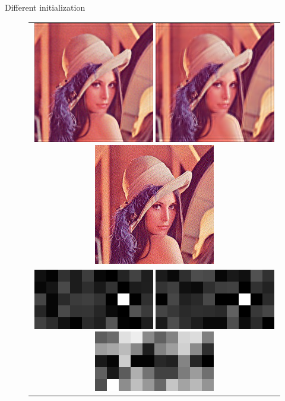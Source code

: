 \documentclass[french]{beamer}
\theoremstyle{plain}
\theoremstyle{remark}
\begin{document}
\begin{frame}{Different initialization}

\begin{figure}
\begin{center}
	\begin{tabular}{c}	
		\includegraphics[scale=0.5]{images/estimation_5px.png}
		\includegraphics[scale=0.5]{images/estimation_0.png}
		\includegraphics[scale=0.5]{images/estimation_N.png}\\
		\includegraphics[scale=0.5]{images/kernels_5px.png}
		\includegraphics[scale=0.5]{images/kernels_0.png}
		\includegraphics[scale=0.5]{images/kernels_N.png}
	\end{tabular}
\end{center}
\end{figure}


\end{frame}
\end{document}
